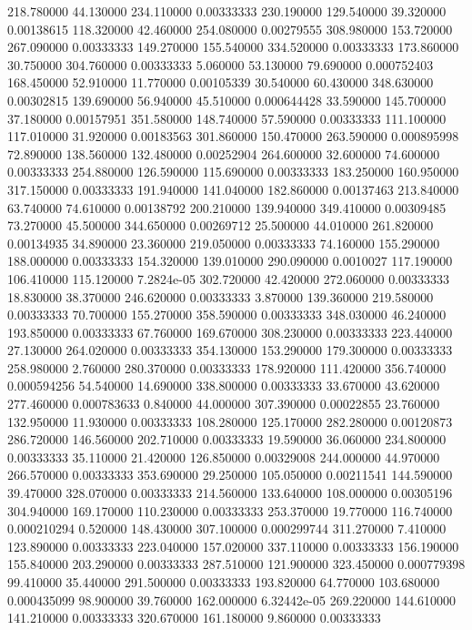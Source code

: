 218.780000	44.130000	234.110000	0.00333333
230.190000	129.540000	39.320000	0.00138615
118.320000	42.460000	254.080000	0.00279555
308.980000	153.720000	267.090000	0.00333333
149.270000	155.540000	334.520000	0.00333333
173.860000	30.750000	304.760000	0.00333333
5.060000	53.130000	79.690000	0.000752403
168.450000	52.910000	11.770000	0.00105339
30.540000	60.430000	348.630000	0.00302815
139.690000	56.940000	45.510000	0.000644428
33.590000	145.700000	37.180000	0.00157951
351.580000	148.740000	57.590000	0.00333333
111.100000	117.010000	31.920000	0.00183563
301.860000	150.470000	263.590000	0.000895998
72.890000	138.560000	132.480000	0.00252904
264.600000	32.600000	74.600000	0.00333333
254.880000	126.590000	115.690000	0.00333333
183.250000	160.950000	317.150000	0.00333333
191.940000	141.040000	182.860000	0.00137463
213.840000	63.740000	74.610000	0.00138792
200.210000	139.940000	349.410000	0.00309485
73.270000	45.500000	344.650000	0.00269712
25.500000	44.010000	261.820000	0.00134935
34.890000	23.360000	219.050000	0.00333333
74.160000	155.290000	188.000000	0.00333333
154.320000	139.010000	290.090000	0.0010027
117.190000	106.410000	115.120000	7.2824e-05
302.720000	42.420000	272.060000	0.00333333
18.830000	38.370000	246.620000	0.00333333
3.870000	139.360000	219.580000	0.00333333
70.700000	155.270000	358.590000	0.00333333
348.030000	46.240000	193.850000	0.00333333
67.760000	169.670000	308.230000	0.00333333
223.440000	27.130000	264.020000	0.00333333
354.130000	153.290000	179.300000	0.00333333
258.980000	2.760000	280.370000	0.00333333
178.920000	111.420000	356.740000	0.000594256
54.540000	14.690000	338.800000	0.00333333
33.670000	43.620000	277.460000	0.000783633
0.840000	44.000000	307.390000	0.00022855
23.760000	132.950000	11.930000	0.00333333
108.280000	125.170000	282.280000	0.00120873
286.720000	146.560000	202.710000	0.00333333
19.590000	36.060000	234.800000	0.00333333
35.110000	21.420000	126.850000	0.00329008
244.000000	44.970000	266.570000	0.00333333
353.690000	29.250000	105.050000	0.00211541
144.590000	39.470000	328.070000	0.00333333
214.560000	133.640000	108.000000	0.00305196
304.940000	169.170000	110.230000	0.00333333
253.370000	19.770000	116.740000	0.000210294
0.520000	148.430000	307.100000	0.000299744
311.270000	7.410000	123.890000	0.00333333
223.040000	157.020000	337.110000	0.00333333
156.190000	155.840000	203.290000	0.00333333
287.510000	121.900000	323.450000	0.000779398
99.410000	35.440000	291.500000	0.00333333
193.820000	64.770000	103.680000	0.000435099
98.900000	39.760000	162.000000	6.32442e-05
269.220000	144.610000	141.210000	0.00333333
320.670000	161.180000	9.860000	0.00333333

